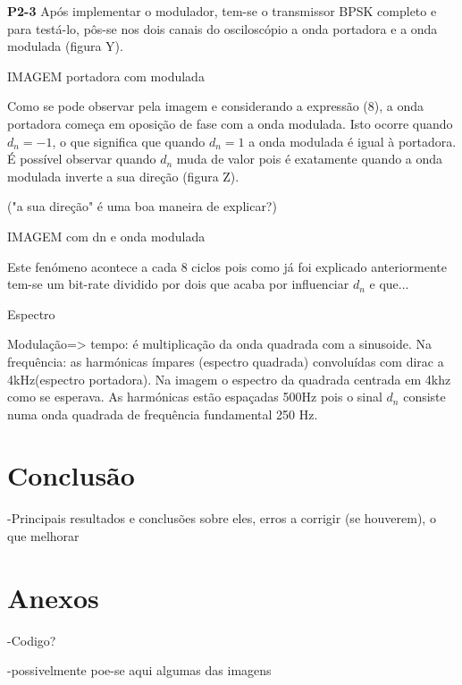 \documentclass[11pt]{article}
\begin{document}
\vspace{2 mm}

\textbf{P2-3}
Após implementar o modulador, tem-se o transmissor BPSK completo e para testá-lo, pôs-se nos dois canais do osciloscópio a onda portadora e a onda modulada (figura Y).

IMAGEM portadora com modulada 
\vspace{2 mm}

Como se pode observar pela imagem e considerando a expressão (8), a onda portadora começa em oposição de fase com a onda modulada. Isto ocorre quando $d_n=-1$, o que significa que quando $d_n=1$ a onda modulada é igual à portadora. É possível observar quando $d_n$ muda de valor pois é exatamente quando a onda modulada inverte a sua direção (figura Z). 

("a sua direção" é uma boa maneira de explicar?) 

IMAGEM com dn e onda modulada

Este fenómeno acontece a cada 8 ciclos pois como já foi explicado anteriormente tem-se um bit-rate dividido por dois que acaba por influenciar $d_n$ e que... 
\vspace{2 mm}

Espectro

Modulação=> tempo: é multiplicação da onda quadrada com a sinusoide. Na frequência: as harmónicas ímpares (espectro quadrada) convoluídas com dirac a 4kHz(espectro portadora).
Na imagem o espectro da quadrada centrada em 4khz como se esperava. As harmónicas estão espaçadas 500Hz pois o sinal $d_n$ consiste numa onda quadrada de frequência fundamental 250 Hz.


\section{Conclusão}
-Principais resultados e conclusões sobre eles, erros a corrigir (se houverem), o que melhorar

\section{Anexos}
-Codigo?

-possivelmente poe-se aqui algumas das imagens	
\end{document}
